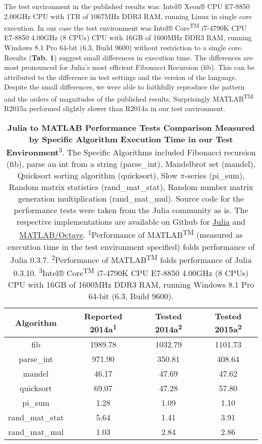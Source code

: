 The test environment in the published results was: Intel® Xeon® CPU E7-8850 2.00GHz CPU with 1TB of 1067MHz DDR3 RAM, running Linux in single core execution. In our case the test environment was Intel® Core\textsuperscript{TM} i7-4790K CPU E7-8850 4.00GHz (8 CPUs) CPU with 16GB of 1600MHz DDR3 RAM, running Windows 8.1 Pro 64-bit (6.3, Build 9600) without restriction to a single core. Results (\textbf{Tab. 1}) suggest small differences in execution time. The differences are most pronounced for Julia's most efficient Fibonacci Recursion (fib). This can be attributed to the difference in test settings and the version of the language. Despite the small differences, we were able to faithfully reproduce the pattern and the orders of magnitudes of the published results. Surprisingly MATLAB\textsuperscript{TM} R2015a performed slightly slower than R2014a in our test environment.

\begin{table} 
    \begin{tabular}{cccc}
    \hline
        \textbf{Algorithm} & \textbf{Reported 2014a\textsuperscript{1}} & \textbf{Tested  2014a\textsuperscript{2}} & \textbf{Tested 2015a\textsuperscript{2}}\\
        \hline
        fib & 1989.78 & 1032.79 & 1101.73 \\ 
        \hline
        parse\_int & 971.90 & 350.81 & 408.64 \\ 
        \hline
        mandel & 46.17 & 47.69 & 47.62 \\ 
        \hline
        quicksort & 69.07 & 47.28 & 57.80 \\ 
        \hline
        pi\_sum & 1.28 & 1.09 & 1.10 \\ 
        \hline
        rand\_mat\_stat & 5.64 & 1.41 & 3.91 \\ 
        \hline
        rand\_mat\_mul & 1.03 & 2.84 & 2.86 \\
        \hline
    \end{tabular}
    \caption{\textbf{Julia to MATLAB Performance Tests Comparison Measured by Specific Algorithm Execution Time in our Test Environment}\textsuperscript{3}. The Specific Algorithms included Fibonacci recursion (fib), parse an int from a string (parse\_int), Mandelbrot set (mandel), Quicksort sorting algorithm (quicksort), Slow $\pi$-series (pi\_sum), Random matrix statistics (rand\_mat\_stat), Random number matrix generation multiplication (rand\_mat\_mul). Source code for the performance tests were taken from the Julia community as is. The respective implementations are available on Github for \href{https://github.com/JuliaLang/julia/blob/master/test/perf/micro/perf.jl}{Julia} and \href{https://github.com/JuliaLang/julia/blob/master/test/perf/micro/perf.m}{MATLAB/Octave}. \textsuperscript{1}Performance of MATLAB\textsuperscript{TM} (measured as execution time in the test environment specified) folds performance of Julia 0.3.7. \textsuperscript{2}Performance of MATLAB\textsuperscript{TM} folds performance of Julia 0.3.10. \textsuperscript{3}Intel® Core\textsuperscript{TM} i7-4790K CPU E7-8850 4.00GHz (8 CPUs) CPU with 16GB of 1600MHz DDR3 RAM, running Windows 8.1 Pro 64-bit (6.3, Build 9600).}
\end{table}
  
